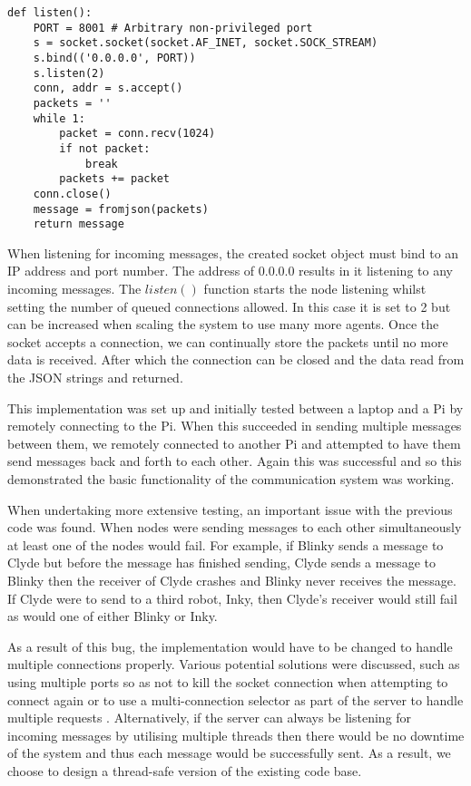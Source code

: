 \begin{lstlisting}
def listen():
    PORT = 8001 # Arbitrary non-privileged port
    s = socket.socket(socket.AF_INET, socket.SOCK_STREAM)
    s.bind(('0.0.0.0', PORT))
    s.listen(2)
    conn, addr = s.accept()
    packets = '' 
    while 1:
        packet = conn.recv(1024)
        if not packet:
            break
        packets += packet
    conn.close()
    message = fromjson(packets)
    return message
\end{lstlisting}
When listening for incoming messages, the created socket object must bind to 
an IP address and port number. The address of 0.0.0.0 results in it listening 
to any incoming messages. The $listen()$ function starts the node listening 
whilst setting the number of queued connections allowed. In this case it is 
set to 2 but can be increased when scaling the system to use many more agents. 
Once the socket  accepts a connection, we can continually store the packets 
until no more data is received. After which the connection can be closed and 
the data read from the JSON strings and returned.

This implementation was set up and initially tested between a laptop and a Pi 
by remotely connecting to the Pi. When this succeeded in sending multiple 
messages between them, we remotely connected to another Pi and attempted to 
have them send messages back and forth to each other. Again this was successful 
and so this demonstrated the basic functionality of the communication system was 
working.

When undertaking more extensive testing, an important issue with the previous 
code was found. When nodes were sending messages to each other simultaneously 
at least one of the nodes would fail. For example, if Blinky sends a message to  
Clyde but before the message has finished sending, Clyde sends a message to 
Blinky then the receiver of Clyde crashes and Blinky never receives the message. 
If Clyde were to send to a third robot, Inky, then Clyde's receiver would still 
fail as would one of either Blinky or Inky. 

As a result of this bug, the implementation would have to be changed to handle 
multiple connections properly. Various potential solutions were discussed, 
such as using multiple ports so as not to kill the socket connection when 
attempting to connect again or to use a multi-connection selector as part of 
the server to handle multiple requests \cite{multiconnectionServer}. 
Alternatively, if the server can always be listening for incoming messages by 
utilising multiple threads then there would be no downtime of the system and 
thus each message would be successfully sent. As a result, we choose to
design a thread-safe version of the existing code base.

